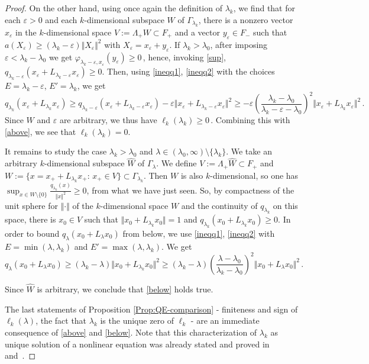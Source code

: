 \documentclass[12pt,reqno]{amsart}
\renewcommand{\(}{\left(}
\renewcommand{\)}{\right)}
\begin{document}
\begin{proof}
On the other hand, using once again the definition of $\lambda_k$, we find that for each $\varepsilon>0$ and each $k$-dimensional subspace $W$ of $\Gamma_{\lambda_k}$, there is a nonzero vector $x_\varepsilon$ in the $k$-dimensional space $V:=\Lambda_+W\subset F_+$ and a vector $y_\varepsilon\in F_-$ such that $a(X_\varepsilon)\geq (\lambda_k-\varepsilon) \Vert X_\varepsilon\Vert^2$ with $X_\varepsilon=x_\varepsilon+y_\varepsilon$. If $\lambda_k>\lambda_0$, after imposing $\varepsilon<\lambda_k-\lambda_0$ we get
${\varphi}_{\lambda_k-\varepsilon,x_\varepsilon}(y_\varepsilon)\geq 0\,$, hence, invoking \eqref{sup},
$q_{\lambda_k-\varepsilon}(x_\varepsilon+L_{\lambda_k-\varepsilon}x_\varepsilon)\geq 0$. Then, using \eqref{ineqq1}, \eqref{ineqq2} with the choices $E=\lambda_k-\varepsilon$, $E'=\lambda_k$, we get
\[q_{\lambda_k}(x_\varepsilon+L_{\lambda_k}x_\varepsilon)\geq q_{\lambda_k-\varepsilon}(x_\varepsilon+L_{\lambda_k-\varepsilon}x_\varepsilon)-\varepsilon\Vert x_\varepsilon+L_{\lambda_k-\varepsilon}x_\varepsilon\Vert^2\geq -\varepsilon\left(\frac{\lambda_k-\lambda_0}{\lambda_k-\varepsilon-\lambda_0}\right)^2\Vert x_\varepsilon+L_{\lambda_k}x_\varepsilon\Vert^2\,.\]
Since $W$ and $\varepsilon$ are arbitrary, we thus have $\ell_k(\lambda_k)\geq 0\,.$ Combining this with \eqref{above}, we see that $\ell_k(\lambda_k)= 0$.

It remains to study the case $\lambda_k>\lambda_0$ and $\lambda\in(\lambda_0,\infty)\setminus\{\lambda_k\}$. We take an arbitrary $k$-dimensional subspace $\widehat{W}$ of $\Gamma_\lambda$. We define $V:=\Lambda_+\widehat{W}\subset F_+$ and $W:=\{x=x_++L_{\lambda_k}x_+:\,x_+\in V\}\subset\Gamma_{\lambda_k}$. Then $W$ is also $k$-dimensional, so one has $\sup_{x\in W\setminus\{0\}}\frac{q_{\lambda_k}(x)}{\Vert x\Vert^2}\geq 0$, from what we have just seen. So, by compactness of the unit sphere for $\Vert\cdot\Vert$ of the $k$-dimensional space $W$ and the continuity of $q_{\lambda_k}$ on this space, there is $x_0\in V$ such that $\Vert x_0+L_{\lambda_k}x_0\Vert=1$ and
$q_{\lambda_k}(x_0+L_{\lambda_k}x_0)\geq 0$. In order to bound $q_{\lambda}(x_0+L_{\lambda}x_0)$ from below, we use \eqref{ineqq1}, \eqref{ineqq2} with $E=\min(\lambda,\lambda_k)$ and $E'=\max(\lambda,\lambda_k)$. We get
\[q_\lambda(x_0+L_\lambda x_0)\geq (\lambda_k-\lambda)\Vert x_0+L_{\lambda_k}x_0\Vert^2\geq (\lambda_k-\lambda)\left(\frac{\lambda-\lambda_0}{\lambda_k-\lambda_0}\right)^2\Vert x_0+L_{\lambda}x_0\Vert^2\,.\]

Since $\widehat{W}$ is arbitrary, we conclude that \eqref{below} holds true.

The last statements of Proposition \ref{Prop:QE-comparison} - finiteness and sign of $\ell_k(\lambda)$, the fact that $\lambda_k$ is the unique zero of $\ell_k$ - are an immediate consequence of \eqref{above} and \eqref{below}. Note that this characterization of $\lambda_k$ as unique solution of a nonlinear equation was already stated and proved in~\cite[Lemma~2.2~(c)]{DES00a} and~\cite[Lemma~2.8~(iii)]{SST20}.
\end{proof}
\end{document}

